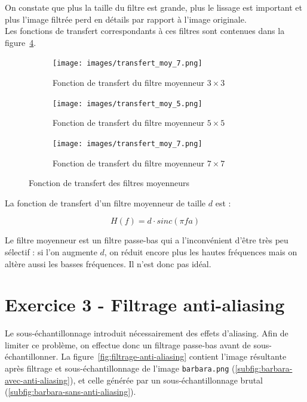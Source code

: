 \documentclass[a4paper]{article}
\newcommand{\figref}[1]{figure~\ref{#1}}
\begin{document}
On constate que plus la taille du filtre est grande, plus le lissage est important et
plus l'image filtrée perd en détails par rapport à l'image originale.\\

Les fonctions de transfert correspondants à ces filtres sont contenues dans la
\figref{fig:transfert-moy}.

\begin{figure}[H]
    \centering
    \begin{subfigure}[c]{0.3\textwidth}
        \centering
        \texttt{[image: images/transfert\_moy\_7.png]}
        \caption{Fonction de transfert du filtre moyenneur $3 \times 3$} 
        \label{subfig:transfert-moy-3}
    \end{subfigure}
    \begin{subfigure}[c]{0.3\textwidth}
        \centering
        \texttt{[image: images/transfert\_moy\_5.png]}
        \caption{Fonction de transfert du filtre moyenneur $5 \times 5$} 
        \label{subfig:transfert-moy-5}
    \end{subfigure}
    \begin{subfigure}[c]{0.3\textwidth}
        \centering
        \texttt{[image: images/transfert\_moy\_7.png]}
        \caption{Fonction de transfert du filtre moyenneur $7 \times 7$} 
        \label{subfig:transfert-moy-7}
    \end{subfigure}
    \caption{Fonction de transfert des filtres moyenneurs}
    \label{fig:transfert-moy}
\end{figure}

La fonction de transfert d'un filtre moyenneur de taille $d$ est :

$$ H(f) = d \cdot sinc(\pi fa)$$

Le filtre moyenneur est un filtre passe-bas qui a l'inconvénient d'être très peu
sélectif : si l'on augmente $d$, on réduit encore plus les hautes fréquences
mais on altère aussi les basses fréquences. Il n'est donc pas idéal.

\section*{Exercice 3 - Filtrage anti-aliasing}

Le sous-échantillonnage introduit nécessairement des effets d'aliasing. Afin de
limiter ce problème, on effectue donc un filtrage passe-bas avant de
sous-échantillonner. La \figref{fig:filtrage-anti-aliasing} contient l'image
résultante après filtrage et sous-échantillonnage de l'image
\texttt{barbara.png} (\ref{subfig:barbara-avec-anti-aliasing}), et celle générée
par un sous-échantillonnage brutal (\ref{subfig:barbara-sans-anti-aliasing}).
\end{document}
